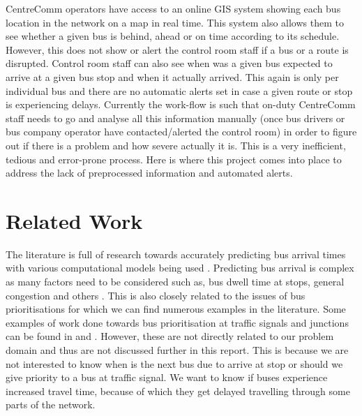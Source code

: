 CentreComm operators have access to an online GIS system showing each bus location in the network on a map in real time. This system also allows them to see whether a given bus is behind, ahead or on time according to its schedule. However, this does not show or alert the control room staff if a bus or a route is disrupted. Control room staff can also see when was a given bus expected to arrive at a given bus stop and when it actually arrived. This again is only per individual bus and there are no automatic alerts set in case a given route or stop is experiencing delays. Currently the work-flow is such that on-duty CentreComm staff needs to go and analyse all this information manually (once bus drivers or bus company operator have contacted/alerted the control room) in order to figure out if there is a problem and how severe actually it is. This is a very inefficient, tedious and error-prone process. Here is where this project comes into place to address the lack of preprocessed information and automated alerts.

\section{Related Work}
The literature is full of research towards accurately predicting bus arrival times with various computational models being used \cite{altinkaya2013urban}. Predicting bus arrival is complex as many factors need to be considered such as, bus dwell time at stops, general congestion and others \cite{jeong2005prediction}. This is also closely related to the issues of bus prioritisations for which we can find numerous examples in the literature. Some examples of work done towards bus prioritisation at traffic signals and junctions can be found in \cite{eps52676} and \cite{clarke2007}. However, these are not directly related to our problem domain and thus are not discussed further in this report. This is because we are not interested to know when is the next bus due to arrive at stop or should we give priority to a bus at traffic signal. We want to know if buses experience increased travel time, because of which they get delayed travelling through some parts of the network. 
 
 

